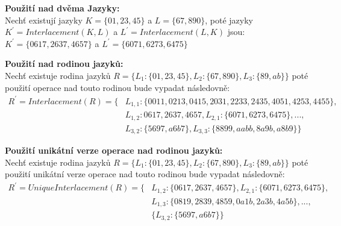 \textbf{Použití nad dvěma Jazyky:}\\
Nechť existují jazyky $K=\{01,23,45\}$ a $L=\{67, 890\}$, poté jazyky $K^{'}=Interlacement(K,L)$ a $L^{'}=Interlacement(L,K)$ jsou:\\
$K^{'}=\{0617,2637,4657\}$ a $L^{'}=\{6071,6273,6475\}$

\textbf{Použití nad rodinou jazyků:}\\
Nechť existuje rodina jazyků $R=\{L_{1}:\{01,23,45\}, L_{2}:\{67,890\}, L_{3}:\{89,ab\}\}$ poté použití operace nad touto rodinou bude vypadat následovně:
\begin{equation*}
	\begin{split}
	R^{'}=Interlacement(R)=\{&L_{1,1}:\{0011,0213,0415,2031,2233,2435,4051,4253,4455\},\\&L_{1,2}:{0617,2637,4657},L_{2,1}:\{6071,6273,6475\},...,\\&L_{3,2}:\{5697,a6b7\},L_{3,3}:\{8899,aabb,8a9b,a8b9\}\}
	\end{split}
\end{equation*}

\textbf{Použití unikátní verze operace nad rodinou jazyků:}\\
Nechť existuje rodina jazyků $R=\{L_{1}:\{01,23,45\}, L_{2}:\{67,890\}, L_{3}:\{89,ab\}\}$ poté použití unikátní verze operace nad touto rodinou bude vypadat následovně:
\begin{equation*}
\begin{split}
R^{'}=UniqueInterlacement(R)=\{&L_{1,2}:\{0617,2637,4657\},L_{2,1}:\{6071,6273,6475\},\\&L_{1,3}:\{0819,2839,4859,0a1b,2a3b,4a5b\},...,\\&\{L_{3,2}:\{5697,a6b7\}\}
\end{split}
\end{equation*}


